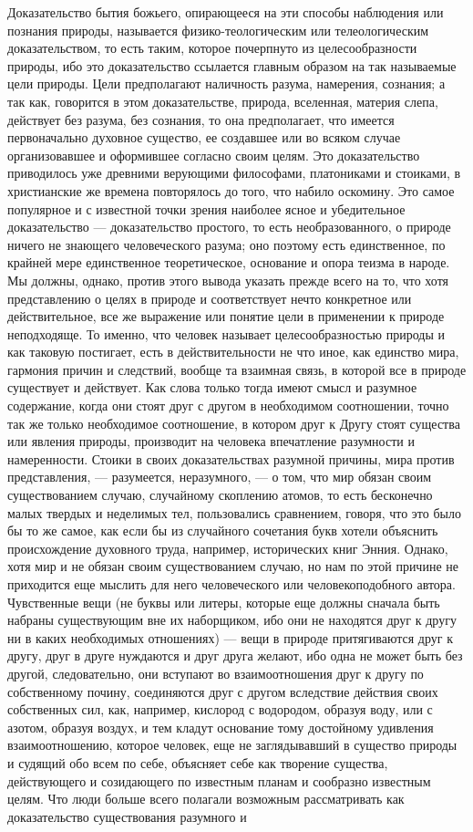 \documentclass[12pt]{article}
\begin{document}
Доказательство бытия божьего, опирающееся на эти способы наблюдения или познания природы, называется физико-теологическим или телеологическим доказательством, то есть таким, которое почерпнуто из целесообразности природы, ибо это доказательство ссылается главным образом на так называемые цели природы. Цели предполагают наличность разума, намерения, сознания; а так как, говорится в этом доказательстве, природа, вселенная, материя слепа, действует без разума, без сознания, то она предполагает, что имеется первоначально духовное существо, ее создавшее или во всяком случае организовавшее и оформившее согласно своим целям. Это доказательство приводилось уже древними верующими философами, платониками и стоиками, в христианские же времена повторялось до того, что набило оскомину. Это самое популярное и с известной точки зрения наиболее ясное и убедительное доказательство --- доказательство простого, то есть необразованного, о природе ничего не знающего человеческого разума; оно поэтому есть единственное, по крайней мере единственное теоретическое, основание и опора теизма в народе. Мы должны, однако, против этого вывода указать прежде всего на то, что хотя представлению о целях в природе и соответствует нечто конкретное или действительное, все же выражение или понятие цели в применении к природе неподходяще. То именно, что человек называет целесообразностью природы и как таковую постигает, есть в действительности не что иное, как единство мира, гармония причин и следствий, вообще та взаимная связь, в которой все в природе существует и действует. Как слова только тогда имеют смысл и разумное содержание, когда они стоят друг с другом в необходимом соотношении, точно так же только необходимое соотношение, в котором друг к Другу стоят существа или явления природы, производит на человека впечатление разумности и намеренности. Стоики в своих доказательствах разумной причины, мира против представления, --- разумеется, неразумного, --- о том, что мир обязан своим существованием случаю, случайному скоплению атомов, то есть бесконечно малых твердых и неделимых тел, пользовались сравнением, говоря, что это было бы то же самое, как если бы из случайного сочетания букв хотели объяснить происхождение духовного труда, например, исторических книг Энния. Однако, хотя мир и не обязан своим существованием случаю, но нам по этой причине не приходится еще мыслить для него человеческого или человекоподобного автора. Чувственные вещи (не буквы или литеры, которые еще должны сначала быть набраны существующим вне их наборщиком, ибо они не находятся друг к другу ни в каких необходимых отношениях) --- вещи в природе притягиваются друг к другу, друг в друге нуждаются и друг друга желают, ибо одна не может быть без другой, следовательно, они вступают во взаимоотношения друг к другу по собственному почину, соединяются друг с другом вследствие действия своих собственных сил, как, например, кислород с водородом, образуя воду, или с азотом, образуя воздух, и тем кладут основание тому достойному удивления взаимоотношению, которое человек, еще не заглядывавший в существо природы и судящий обо всем по себе, объясняет себе как творение существа, действующего и созидающего по известным планам и сообразно известным целям. Что люди больше всего полагали возможным рассматривать как доказательство существования разумного и 
\end{document}
